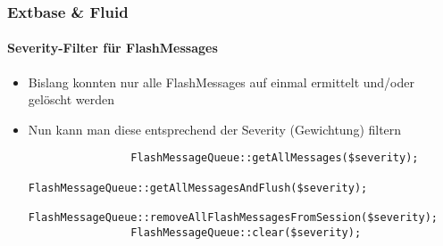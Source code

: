%

\begin{frame}[fragile]
	\frametitle{Extbase \& Fluid}
	\framesubtitle{Severity-Filter für FlashMessages}

	\begin{itemize}

		\item Bislang konnten nur alle FlashMessages auf einmal ermittelt und/oder gelöscht werden
		\item Nun kann man diese entsprechend der Severity (Gewichtung) filtern

			\begin{lstlisting}
				FlashMessageQueue::getAllMessages($severity);
				FlashMessageQueue::getAllMessagesAndFlush($severity);
				FlashMessageQueue::removeAllFlashMessagesFromSession($severity);
				FlashMessageQueue::clear($severity);
			\end{lstlisting}

	\end{itemize}

\end{frame}


